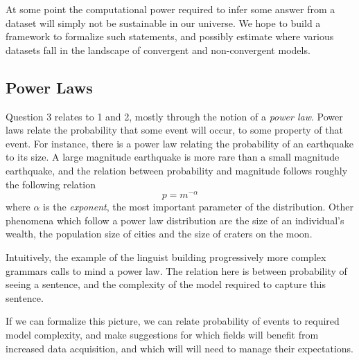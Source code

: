 \documentclass{article}
\begin{document}
At some point the computational power required to infer some answer from a dataset will simply not be sustainable in our universe. We hope to build a framework to formalize such statements, and possibly estimate where various datasets fall in the landscape of convergent and non-convergent models.

\subsection*{Power Laws}

Question 3 relates to 1 and 2, mostly through the notion of a \emph{power law}. Power laws relate the probability that some event will occur, to some property of that event. For instance, there is a power law relating the probability of an earthquake to its size. A large magnitude earthquake is more rare than a small magnitude earthquake, and the relation between probability and magnitude follows roughly the following relation 
\[
p = m^{-\alpha}
\] 
where $\alpha$ is the \emph{exponent}, the most important parameter of the distribution. Other phenomena which follow a power law distribution are the size of an individual's wealth, the population size of cities and the size of craters on the moon.

Intuitively, the example of the linguist building progressively more complex grammars calls to mind a power law. The relation here is between probability of seeing a sentence, and the complexity of the model required to capture this sentence. 

If we can formalize this picture, we can relate probability of events to required model complexity, and make suggestions for which fields will benefit from increased data acquisition, and which will will need to manage their expectations. 
\end{document}
